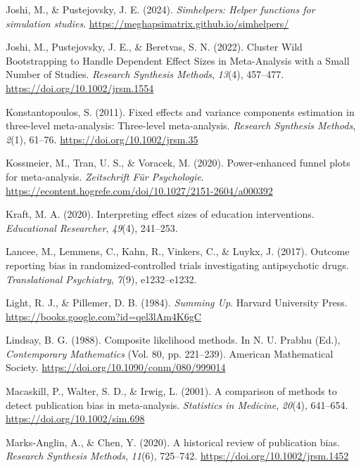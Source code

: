 \documentclass[
  man, donotrepeattitle,floatsintext]{apa7}
\newlength{\cslhangindent}
\newenvironment{CSLReferences}[2] %
 {\begin{list}{}{%
  \setlength{\itemindent}{0pt}
  \setlength{\leftmargin}{0pt}
  \setlength{\parsep}{0pt}
  \ifodd #1
   \setlength{\leftmargin}{\cslhangindent}
   \setlength{\itemindent}{-1\cslhangindent}
  \fi
  \setlength{\itemsep}{#2\baselineskip}}}
 {\end{list}}
\begin{document}
\begin{CSLReferences}{1}{0}
Joshi, M., \& Pustejovsky, J. E. (2024). \emph{Simhelpers: Helper functions for simulation studies}. \url{https://meghapsimatrix.github.io/simhelpers/}

Joshi, M., Pustejovsky, J. E., \& Beretvas, S. N. (2022). Cluster Wild Bootstrapping to Handle Dependent Effect Sizes in Meta-Analysis with a Small Number of Studies. \emph{Research Synthesis Methods}, \emph{13}(4), 457--477. \url{https://doi.org/10.1002/jrsm.1554}

Konstantopoulos, S. (2011). Fixed effects and variance components estimation in three-level meta-analysis: {Three}-level meta-analysis. \emph{Research Synthesis Methods}, \emph{2}(1), 61--76. \url{https://doi.org/10.1002/jrsm.35}

Kossmeier, M., Tran, U. S., \& Voracek, M. (2020). Power-enhanced funnel plots for meta-analysis. \emph{Zeitschrift Für Psychologie}. \url{https://econtent.hogrefe.com/doi/10.1027/2151-2604/a000392}

Kraft, M. A. (2020). Interpreting effect sizes of education interventions. \emph{Educational Researcher}, \emph{49}(4), 241--253.

Lancee, M., Lemmens, C., Kahn, R., Vinkers, C., \& Luykx, J. (2017). Outcome reporting bias in randomized-controlled trials investigating antipsychotic drugs. \emph{Translational Psychiatry}, \emph{7}(9), e1232--e1232.

Light, R. J., \& Pillemer, D. B. (1984). \emph{Summing {Up}}. {Harvard University Press}. \url{https://books.google.com?id=qel3lAm4K6gC}

Lindsay, B. G. (1988). Composite likelihood methods. In N. U. Prabhu (Ed.), \emph{Contemporary {Mathematics}} (Vol. 80, pp. 221--239). American Mathematical Society. \url{https://doi.org/10.1090/conm/080/999014}

Macaskill, P., Walter, S. D., \& Irwig, L. (2001). A comparison of methods to detect publication bias in meta-analysis. \emph{Statistics in Medicine}, \emph{20}(4), 641--654. \url{https://doi.org/10.1002/sim.698}

Marks‐Anglin, A., \& Chen, Y. (2020). A historical review of publication bias. \emph{Research Synthesis Methods}, \emph{11}(6), 725--742. \url{https://doi.org/10.1002/jrsm.1452}


\end{CSLReferences}
\end{document}
